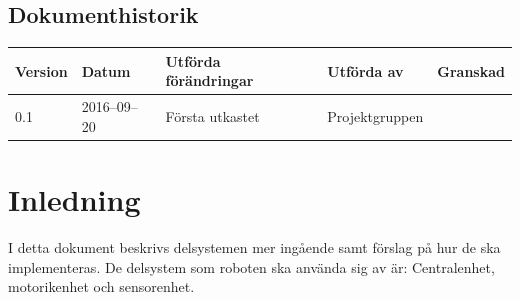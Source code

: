 \documentclass[a4paper,titlepage,12pt]{article}
\begin{document}
\begin{center}
		\newpage
		\tableofcontents
		\newpage



		\section*{Dokumenthistorik}
		\renewcommand*{\arraystretch}{1.4}
		\begin{longtable}[c]{ l l l l l }
			\textbf{Version} & \textbf{Datum} & \textbf{Utförda förändringar} 
			& \textbf{Utförda av} & \textbf{Granskad} \\ \midrule
			
			0.1 & 2016--09--20 & Första utkastet & Projektgruppen & \\
		\end{longtable}
	\end{center}


	\newpage

	\section{Inledning}
	I detta dokument beskrivs delsystemen mer ingående samt förslag på hur de ska 
    implementeras. De delsystem som roboten ska använda sig av är:
	Centralenhet, motorikenhet och sensorenhet.


  \newpage
\end{document}
